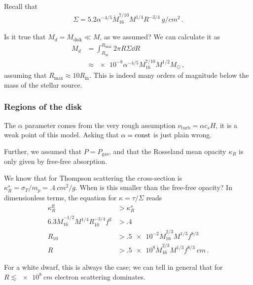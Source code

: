 \documentclass[main.tex]{subfiles}
\begin{document}

Recall that 
%
\begin{align}
\Sigma = \num{5.2} \alpha^{-4/5} \dot{M}_{16}^{7/10} M^{1/4} R^{-3/4} \SI{}{g / cm^2}
\,.
\end{align}

Is it true that \(M_d = M _{\text{disk}} \ll M\), as we assumed? 
We can calculate it as 
%
\begin{align}
M_d &= \int_{R _{\text{in}}}^{R _{\text{max}}} 2 \pi R \Sigma \dd{R}  \\
&\approx \num{e-8} \alpha^{-4/5} M_{16}^{7/10} M^{1/2} M_{\odot}
\,,
\end{align}
%
assuming that \(R _{\text{max}} \approx 10 R _{\text{in}}\).
This is indeed many orders of magnitude below the mass of the stellar source. 

\subsubsection{Regions of the disk}

The \(\alpha \) parameter comes from the very rough assumption \(\nu _{\text{turb}} = \alpha c_s H\), it is a weak point of this model.
Asking that \(\alpha = \text{const}\) is just plain wrong. 

Further, we assumed that \(P = P _{\text{gas}}\), and that the Rosseland mean opacity \(\kappa _R\) is only given by free-free absorption. 

We know that for Thompson scattering the cross-section is \(\kappa _R^{s} = \sigma _T / m_p = \SI{.4}{cm^2 / g}\). 
When is this smaller than the free-free opacity? In dimensionless terms, the equation for \(\kappa = \tau / \Sigma \) reads
%
\begin{align}
\kappa_{R}^{\text{ff}} &> \kappa_R^{s} \\
\num{6.3} \dot{M}_{16}^{-1/2} M^{1/4} R_{10}^{-3/4} f^2 &> \num{.4}  \\
R_{10} &> \num{.5e-2} \dot{M}_{16}^{2/3} M^{1/3} f^{8/3} \\
R &> \num{.5e8} \dot{M}_{16}^{2/3} M^{1/3} f^{8/3} \SI{}{cm}
\,.
\end{align}

For a white dwarf, this is always the case; we can tell in general that for \(R \lesssim \SI{e8}{cm}\) electron scattering dominates.
\end{document}
